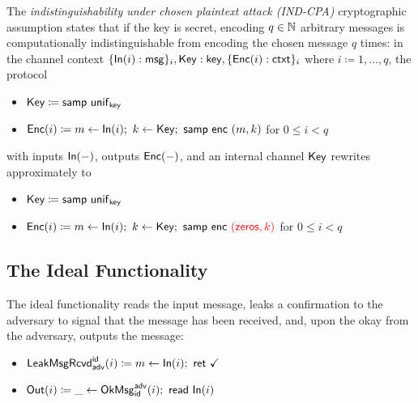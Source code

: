 The \emph{indistinguishability under chosen plaintext attack (IND-CPA)} cryptographic assumption states that if the key is secret, encoding $q \in \mathbb{N}$ arbitrary messages is computationally indistinguishable from encoding the chosen message $q$ times: in the channel context $\{\mathsf{In}(i) : \mathsf{msg}\}_i, \mathsf{Key} : \mathsf{key}, \{\mathsf{Enc}(i) : \mathsf{ctxt}\}_i$ where $i \coloneqq 1,\dots,q$, the protocol
\begin{itemize}
\item $\mathsf{Key} \coloneqq \mathsf{samp} \ \mathsf{unif}_{\mathsf{key}}$
\item $\mathsf{Enc}(i) \coloneqq m \leftarrow \mathsf{In}(i); \ k \leftarrow \mathsf{Key}; \ \mathsf{samp} \ \mathsf{enc} \ (m,k)$ for $0 \leq i < q$
\end{itemize}
with inputs $\mathsf{In}(-)$, outputs $\mathsf{Enc}(-)$, and an internal channel $\mathsf{Key}$ rewrites approximately to
\begin{itemize}
\item $\mathsf{Key} \coloneqq \mathsf{samp} \ \mathsf{unif}_{\mathsf{key}}$
\item $\mathsf{Enc}(i) \coloneqq m \leftarrow \mathsf{In}(i); \ k \leftarrow \mathsf{Key}; \ \mathsf{samp} \ \mathsf{enc} \ {\color{red} (\mathsf{zeros}, k)}$ for $0 \leq i < q$
\end{itemize}

\subsection{The Ideal Functionality}
The ideal functionality reads the input message, leaks a confirmation to the adversary to signal that the message has been received, and, upon the okay from the adversary, outputs the message:
\begin{itemize}
\item $\mathsf{LeakMsgRcvd}^{\mathsf{id}}_{\mathsf{adv}}(i) \coloneqq m \leftarrow \mathsf{In}(i); \ \mathsf{ret} \ \checkmark$
\item $\mathsf{Out}(i) \coloneqq \_ \leftarrow \mathsf{OkMsg}^{\mathsf{adv}}_{\mathsf{id}}(i); \ \mathsf{read} \ \mathsf{In}(i)$
\end{itemize}


